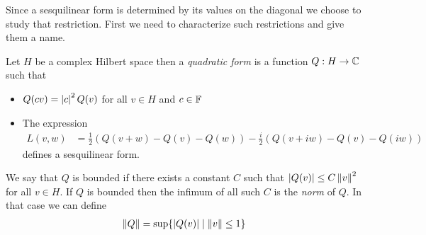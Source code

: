 Since a sesquilinear form is determined by its values on the diagonal we choose to study that restriction.  First we need to characterize such restrictions and give them a name.
\begin{defn}Let $H$ be a complex Hilbert space then a \emph{quadratic form} is a function $Q : H \to \mathbb{C}$ such that 
\begin{itemize}
\item[(i)] $Q(c v) = \left \vert c \right \vert^2 Q(v)$ for all $v \in H$ and $c \in \mathbb{F}$
\item[(ii)] The expression
\begin{align*}
L(v,w) &= \frac{1}{2} \left ( Q(v+w) - Q(v) - Q(w) \right) - \frac{i}{2} \left (Q(v+iw) - Q(v) - Q(iw) \right) 
\end{align*}
defines a sesquilinear form.
\end{itemize}
We say that $Q$ is bounded if there exists a constant $C$ such that $\left \vert Q(v) \right \vert \leq C \left \lVert v \right \rVert^2$ for all $v \in H$.  If $Q$ is bounded then the infimum of all such $C$ is the \emph{norm} of $Q$.  In that case we can define 
\begin{align*}
\left \lVert Q \right \rVert = \sup \lbrace \left \vert Q(v) \right \vert \mid \left \lVert v \right \rVert \leq 1 \rbrace
\end{align*}
\end{defn}

